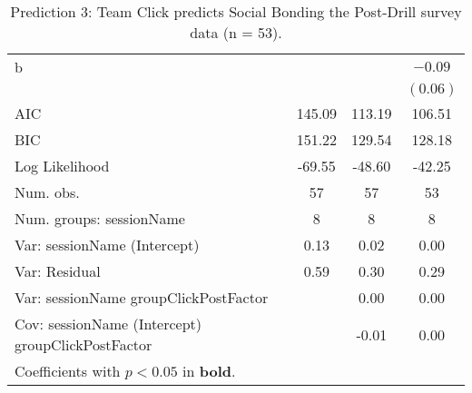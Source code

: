\begin{table}
\begin{center}
\begin{tabular}{l c c c }
b                                                 &          &                       & $-0.09$               \\
                                                  &          &                       & $(0.06)$              \\
\midrule
AIC                                               & 145.09   & 113.19                & 106.51                \\
BIC                                               & 151.22   & 129.54                & 128.18                \\
Log Likelihood                                    & -69.55   & -48.60                & -42.25                \\
Num. obs.                                         & 57       & 57                    & 53                    \\
Num. groups: sessionName                          & 8        & 8                     & 8                     \\
Var: sessionName (Intercept)                      & 0.13     & 0.02                  & 0.00                  \\
Var: Residual                                     & 0.59     & 0.30                  & 0.29                  \\
Var: sessionName groupClickPostFactor             &          & 0.00                  & 0.00                  \\
Cov: sessionName (Intercept) groupClickPostFactor &          & -0.01                 & 0.00                  \\
\bottomrule
\multicolumn{4}{l}{\scriptsize{Coefficients with $p < 0.05$ in \textbf{bold}.}}
\end{tabular}
\caption{Prediction 3: Team Click predicts Social Bonding the Post-Drill survey data (n = 53).}
\label{tab:TEM2clickBonding}
\end{center}
\end{table}
